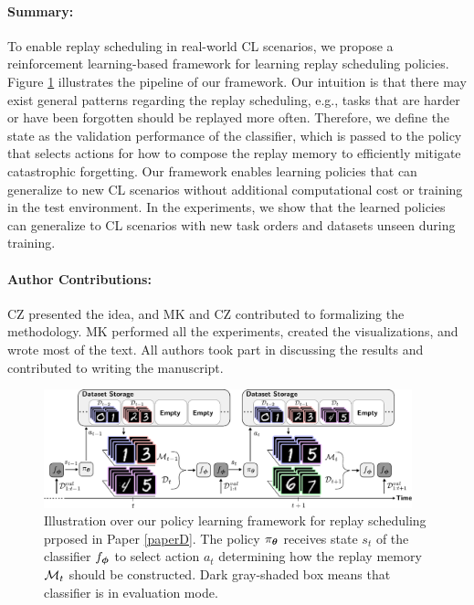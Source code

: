 \vspace{-3mm}
\paragraph{Summary:} To enable replay scheduling in real-world CL scenarios, we propose a reinforcement learning-based framework for learning replay scheduling policies. Figure \ref{fig:paperD_our_approach} illustrates the pipeline of our framework. Our intuition is that there may exist general patterns regarding the replay scheduling, e.g., tasks that are harder or have been forgotten should be replayed more often. Therefore, we define the state as the validation performance of the classifier, which is passed to the policy that selects actions for how to compose the replay memory to efficiently mitigate catastrophic forgetting. Our framework enables learning policies that can generalize to new CL scenarios without additional computational cost or training in the test environment. In the experiments, we show that the learned policies can generalize to CL scenarios with new task orders and datasets unseen during training. 

\vspace{-3mm}
\paragraph{Author Contributions:} CZ presented the idea, and MK and CZ contributed to formalizing the methodology. MK performed all the experiments, created the visualizations, and wrote most of the text. All authors took part in discussing the results and contributed to writing the manuscript. 

\begin{figure}[t]
	\centering 
	\includegraphics[width=0.95\textwidth]{Chapter1/figures/testing_size2.pdf}
	\caption{Illustration over our policy learning framework for replay scheduling prposed in Paper \ref{paperD}. The policy $\pi_{{\bm{\theta}}}$ receives state $s_t$ of the classifier $f_{{\bm{\phi}}}$ to select action $a_t$ determining how the replay memory ${\mathcal{M}}_t$ should be constructed. Dark gray-shaded box means that classifier is in evaluation mode.}
	\label{fig:paperD_our_approach}
	\vspace{-2mm}
\end{figure}

